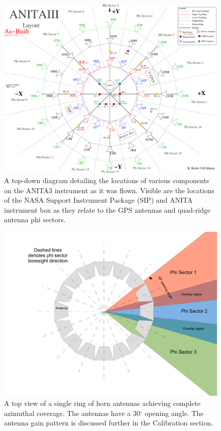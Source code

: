 \begin{figure}
\centering
	\includegraphics[width=\textwidth]{figures/ANITA3_layout_asBuilt}
	\caption{A top-down diagram detailing the locations of various components on the ANITA3 instrument as it was flown.  Visible are the locations of the NASA Support Instrument Package (SIP) and ANITA instrument box as they relate to the GPS antennas and quad-ridge antenna phi sectors.}
	\label{fig:ANITA3_asBuilt}
\end{figure}

\begin{figure}
\centering
	\includegraphics[width=\textwidth]{figures/phiSectors} 
	\caption{A top view of a single ring of horn antennas achieving complete azimuthal coverage.  The antennas have a  30$^{\circ}$  opening angle.  The antenna gain pattern is discussed further in the Calibration section.}
	\label{fig:phiSectors}
\end{figure}

